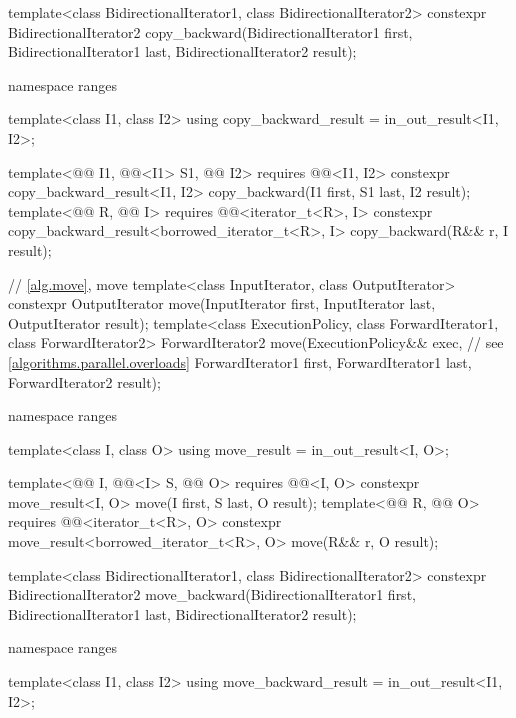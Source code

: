 \begin{codeblock}
{  template<class BidirectionalIterator1, class BidirectionalIterator2>
    constexpr BidirectionalIterator2
      copy_backward(BidirectionalIterator1 first, BidirectionalIterator1 last,
                    BidirectionalIterator2 result);

  namespace ranges {
    template<class I1, class I2>
      using copy_backward_result = in_out_result<I1, I2>;

    template<@@ I1, @@<I1> S1, @@ I2>
      requires @@<I1, I2>
      constexpr copy_backward_result<I1, I2>
        copy_backward(I1 first, S1 last, I2 result);
    template<@@ R, @@ I>
      requires @@<iterator_t<R>, I>
      constexpr copy_backward_result<borrowed_iterator_t<R>, I>
        copy_backward(R&& r, I result);
  }

  // \ref{alg.move}, move
  template<class InputIterator, class OutputIterator>
    constexpr OutputIterator move(InputIterator first, InputIterator last,
                                  OutputIterator result);
  template<class ExecutionPolicy, class ForwardIterator1,
           class ForwardIterator2>
    ForwardIterator2 move(ExecutionPolicy&& exec,               // see \ref{algorithms.parallel.overloads}
                          ForwardIterator1 first, ForwardIterator1 last,
                          ForwardIterator2 result);

  namespace ranges {
    template<class I, class O>
      using move_result = in_out_result<I, O>;

    template<@@ I, @@<I> S, @@ O>
      requires @@<I, O>
      constexpr move_result<I, O>
        move(I first, S last, O result);
    template<@@ R, @@ O>
      requires @@<iterator_t<R>, O>
      constexpr move_result<borrowed_iterator_t<R>, O>
        move(R&& r, O result);
  }

  template<class BidirectionalIterator1, class BidirectionalIterator2>
    constexpr BidirectionalIterator2
      move_backward(BidirectionalIterator1 first, BidirectionalIterator1 last,
                    BidirectionalIterator2 result);

  namespace ranges {
    template<class I1, class I2>
      using move_backward_result = in_out_result<I1, I2>;

}}
\end{codeblock}
